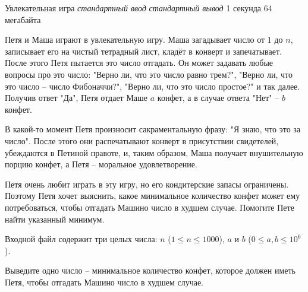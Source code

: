 \begin{problem}%
{Увлекательная игра}%
{\textsl{стандартный ввод}}%
{\textsl{стандартный вывод}}%
{1 секунда}%
{64 мегабайта}%
{}

Петя и Маша играют в увлекательную игру. Маша загадывает число от $1$ до $n$, записывает его на чистый тетрадный лист, кладёт в конверт и запечатывает. После этого Петя пытается это число отгадать. Он может задавать любые вопросы про это число: "Верно ли, что это число равно трем?", "Верно ли, что это число – число Фибоначчи?", "Верно ли, что это число простое?" и так далее. Получив ответ "Да", Петя отдает Маше $a$ конфет, а в случае ответа "Нет" – $b$ конфет.

В какой-то момент Петя произносит сакраментальную фразу: "Я знаю, что это за число". После этого они распечатывают конверт в присутствии свидетелей, убеждаются в Петиной правоте, и, таким образом, Маша получает внушительную порцию конфет, а Петя – моральное удовлетворение.

Петя очень любит играть в эту игру, но его кондитерские запасы ограничены. Поэтому Петя хочет выяснить, какое минимальное количество конфет может ему потребоваться, чтобы отгадать Машино число в худшем случае. Помогите Пете найти указанный минимум.

\InputFile

Входной файл содержит три целых числа: $n$ ($1 \le n \le 1000$), $a$ и $b$ ($0 \le a, b \le 10^6$).

\OutputFile

Выведите одно число – минимальное количество конфет, которое должен иметь Петя, чтобы отгадать Машино число в худшем случае.

\Examples

\begin{example}
%
%
%
\end{example}
\end{problem}
